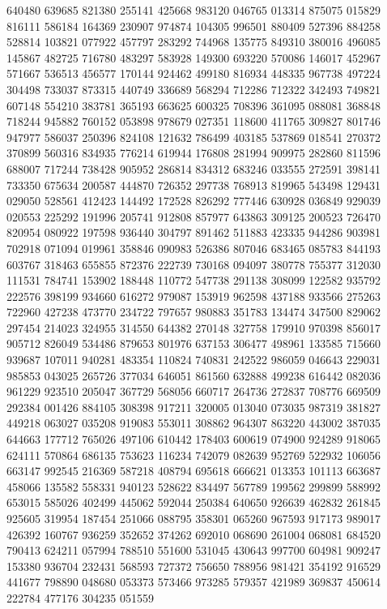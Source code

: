 {640480 639685 821380 255141 425668 983120 046765 013314 875075 015829 816111%
586184 164369 230907 974874 104305 996501 880409 527396 884258 528814 103821%
077922 457797 283292 744968 135775 849310 380016 496085 145867 482725 716780%
483297 583928 149300 693220 570086 146017 452967 571667 536513 456577 170144%
924462 499180 816934 448335 967738 497224 304498 733037 873315 440749 336689%
568294 712286 712322 342493 749821 607148 554210 383781 365193 663625 600325%
708396 361095 088081 368848 718244 945882 760152 053898 978679 027351 118600%
411765 309827 801746 947977 586037 250396 824108 121632 786499 403185 537869%
018541 270372 370899 560316 834935 776214 619944 176808 281994 909975 282860%
811596 688007 717244 738428 905952 286814 834312 683246 033555 272591 398141%
733350 675634 200587 444870 726352 297738 768913 819965 543498 129431 029050%
528561 412423 144492 172528 826292 777446 630928 036849 929039 020553 225292%
191996 205741 912808 857977 643863 309125 200523 726470 820954 080922 197598%
936440 304797 891462 511883 423335 944286 903981 702918 071094 019961 358846%
090983 526386 807046 683465 085783 844193 603767 318463 655855 872376 222739%
730168 094097 380778 755377 312030 111531 784741 153902 188448 110772 547738%
291138 308099 122582 935792 222576 398199 934660 616272 979087 153919 962598%
437188 933566 275263 722960 427238 473770 234722 797657 980883 351783 134474%
347500 829062 297454 214023 324955 314550 644382 270148 327758 179910 970398%
856017 905712 826049 534486 879653 801976 637153 306477 498961 133585 715660%
939687 107011 940281 483354 110824 740831 242522 986059 046643 229031 985853%
043025 265726 377034 646051 861560 632888 499238 616442 082036 961229 923510%
205047 367729 568056 660717 264736 272837 708776 669509 292384 001426 884105%
308398 917211 320005 013040 073035 987319 381827 449218 063027 035208 919083%
553011 308862 964307 863220 443002 387035 644663 177712 765026 497106 610442%
178403 600619 074900 924289 918065 624111 570864 686135 753623 116234 742079%
082639 952769 522932 106056 663147 992545 216369 587218 408794 695618 666621%
013353 101113 663687 458066 135582 558331 940123 528622 834497 567789 199562%
299899 588992 653015 585026 402499 445062 592044 250384 640650 926639 462832%
261845 925605 319954 187454 251066 088795 358301 065260 967593 917173 989017%
426392 160767 936259 352652 374262 692010 068690 261004 068081 684520 790413%
624211 057994 788510 551600 531045 430643 997700 604981 909247 153380 936704%
232431 568593 727372 756650 788956 981421 354192 916529 441677 798890 048680%
053373 573466 973285 579357 421989 369837 450614 222784 477176 304235 051559%
}
